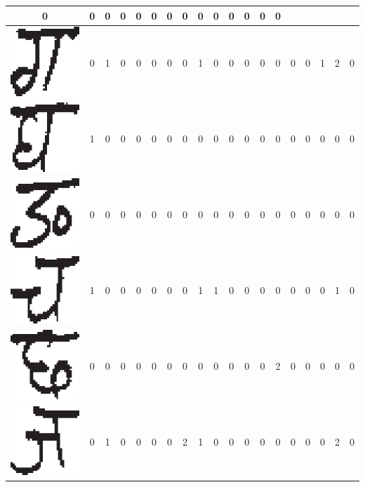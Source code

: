 \begin{table}[h]
\begin{tabular}{|c|c|c|c|c|c|c|c|c|c|c|c|c|c|c|c|c|c|c|}
0 & 0 & 0 & 0 & 0 & 0 & 0 & 0 & 0 & 0 & 0 & 0 & 0 & 0\tabularnewline
\hline
\includegraphics[scale=0.25]{figures/datasets/nhcr/consonants/3ga} & 0 & 1 & 0 & 0 & 0 & 0 & 0 & 1 & 0 & 0 & 0 & 0 & 0 & 0 & 0 & 1 & 2 & 0\tabularnewline
\hline
\includegraphics[scale=0.25]{figures/datasets/nhcr/consonants/4gha} & 1 & 0 & 0 & 0 & 0 & 0 & 0 & 0 & 0 & 0 & 0 & 0 & 0 & 0 & 0 & 0 & 0 & 0\tabularnewline
\hline
\includegraphics[scale=0.25]{figures/datasets/nhcr/consonants/5na} & 0 & 0 & 0 & 0 & 0 & 0 & 0 & 0 & 0 & 0 & 0 & 0 & 0 & 0 & 0 & 0 & 0 & 0\tabularnewline
\hline
\includegraphics[scale=0.25]{figures/datasets/nhcr/consonants/6cha} & 1 & 0 & 0 & 0 & 0 & 0 & 0 & 1 & 1 & 0 & 0 & 0 & 0 & 0 & 0 & 0 & 1 & 0\tabularnewline
\hline
\includegraphics[scale=0.25]{figures/datasets/nhcr/consonants/7chha} & 0 & 0 & 0 & 0 & 0 & 0 & 0 & 0 & 0 & 0 & 0 & 0 & 2 & 0 & 0 & 0 & 0 & 0\tabularnewline
\hline
\includegraphics[scale=0.25]{figures/datasets/nhcr/consonants/8ja} & 0 & 1 & 0 & 0 & 0 & 0 & 2 & 1 & 0 & 0 & 0 & 0 & 0 & 0 & 0 & 0 & 2 & 0\tabularnewline

\end{tabular}
\end{table}
